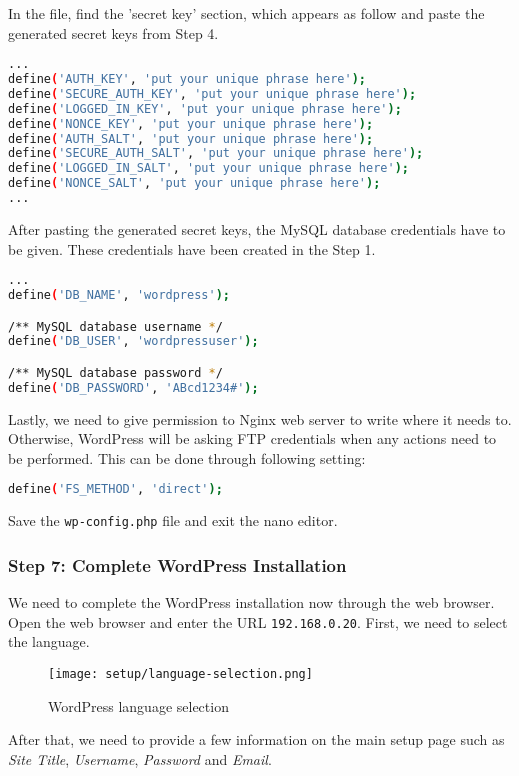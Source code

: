 In the file, find the 'secret key' section, which appears as follow and paste the generated secret keys from Step 4.
\begin{lstlisting}[language=sh]
...
define('AUTH_KEY', 'put your unique phrase here');
define('SECURE_AUTH_KEY', 'put your unique phrase here');
define('LOGGED_IN_KEY', 'put your unique phrase here');
define('NONCE_KEY', 'put your unique phrase here');
define('AUTH_SALT', 'put your unique phrase here');
define('SECURE_AUTH_SALT', 'put your unique phrase here');
define('LOGGED_IN_SALT', 'put your unique phrase here');
define('NONCE_SALT', 'put your unique phrase here');
...
\end{lstlisting}


After pasting the generated secret keys, the MySQL database credentials have to be given. These credentials have been created in the Step 1.
\begin{lstlisting}[language=sh]
...
define('DB_NAME', 'wordpress');

/** MySQL database username */
define('DB_USER', 'wordpressuser');

/** MySQL database password */
define('DB_PASSWORD', 'ABcd1234#');
\end{lstlisting}

Lastly, we need to give permission to Nginx web server to write where it needs to. Otherwise, WordPress will be asking FTP credentials when any actions need to be performed. This can be done through following setting:
\begin{lstlisting}[language=sh]
define('FS_METHOD', 'direct');
\end{lstlisting}

Save the \texttt{wp-config.php} file and exit the nano editor.

\subsubsection*{Step 7: Complete WordPress Installation}
We need to complete the WordPress installation now through the web browser. Open the web browser and enter the URL \texttt{192.168.0.20}. First, we need to select the language.

\begin{figure}[ht]
\caption{WordPress language selection}
\label{fig:wordpress-language-selection}
\centering
\texttt{[image: setup/language-selection.png]}
\end{figure}

After that, we need to provide a few information on the main setup page such as \emph{Site Title}, \emph{Username}, \emph{Password} and \emph{Email}.

